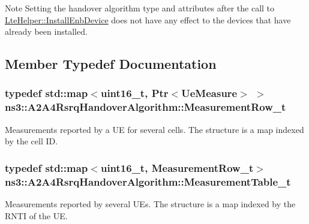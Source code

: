 \begin{DoxyNote}{Note}
Setting the handover algorithm type and attributes after the call to \hyperlink{classns3_1_1LteHelper_a5e009ad35ef85f46b5a6099263f15a03}{Lte\+Helper\+::\+Install\+Enb\+Device} does not have any effect to the devices that have already been installed. 
\end{DoxyNote}


\subsection{Member Typedef Documentation}
\subsubsection[{\texorpdfstring{Measurement\+Row\+\_\+t}{MeasurementRow_t}}]{\setlength{\rightskip}{0pt plus 5cm}typedef std\+::map$<$uint16\+\_\+t, {\bf Ptr}$<${\bf Ue\+Measure}$>$ $>$ {\bf ns3\+::\+A2\+A4\+Rsrq\+Handover\+Algorithm\+::\+Measurement\+Row\+\_\+t}\hspace{0.3cm}{\ttfamily [private]}}\hypertarget{classns3_1_1A2A4RsrqHandoverAlgorithm_a36b466ab32bda84bd5a6c0843608ab2a}{}\label{classns3_1_1A2A4RsrqHandoverAlgorithm_a36b466ab32bda84bd5a6c0843608ab2a}
Measurements reported by a UE for several cells. The structure is a map indexed by the cell ID. 
\subsubsection[{\texorpdfstring{Measurement\+Table\+\_\+t}{MeasurementTable_t}}]{\setlength{\rightskip}{0pt plus 5cm}typedef std\+::map$<$uint16\+\_\+t, {\bf Measurement\+Row\+\_\+t}$>$ {\bf ns3\+::\+A2\+A4\+Rsrq\+Handover\+Algorithm\+::\+Measurement\+Table\+\_\+t}\hspace{0.3cm}{\ttfamily [private]}}\hypertarget{classns3_1_1A2A4RsrqHandoverAlgorithm_a27c0f07941cacc1c54a799a27ea7821c}{}\label{classns3_1_1A2A4RsrqHandoverAlgorithm_a27c0f07941cacc1c54a799a27ea7821c}
Measurements reported by several U\+Es. The structure is a map indexed by the R\+N\+TI of the UE. 

